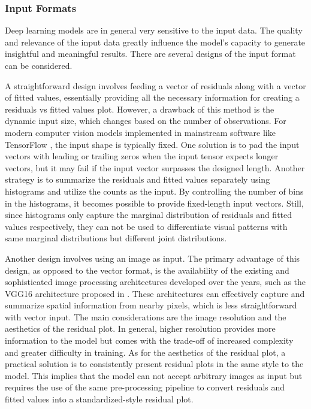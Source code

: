 \documentclass[]{interact}
\theoremstyle{plain}%
\theoremstyle{definition}
\theoremstyle{remark}
\begin{document}
\subsubsection{Input Formats}\label{input-formats}

Deep learning models are in general very sensitive to the input data.
The quality and relevance of the input data greatly influence the
model's capacity to generate insightful and meaningful results. There
are several designs of the input format can be considered.

A straightforward design involves feeding a vector of residuals along
with a vector of fitted values, essentially providing all the necessary
information for creating a residuals vs fitted values plot. However, a
drawback of this method is the dynamic input size, which changes based
on the number of observations. For modern computer vision models
implemented in mainstream software like TensorFlow
\citep{abadi2016tensorflow}, the input shape is typically fixed. One
solution is to pad the input vectors with leading or trailing zeros when
the input tensor expects longer vectors, but it may fail if the input
vector surpasses the designed length. Another strategy is to summarize
the residuals and fitted values separately using histograms and utilize
the counts as the input. By controlling the number of bins in the
histograms, it becomes possible to provide fixed-length input vectors.
Still, since histograms only capture the marginal distribution of
residuals and fitted values respectively, they can not be used to
differentiate visual patterns with same marginal distributions but
different joint distributions.

Another design involves using an image as input. The primary advantage
of this design, as opposed to the vector format, is the availability of
the existing and sophisticated image processing architectures developed
over the years, such as the VGG16 architecture proposed in
\citet{simonyan2014very}. These architectures can effectively capture
and summarize spatial information from nearby pixels, which is less
straightforward with vector input. The main considerations are the image
resolution and the aesthetics of the residual plot. In general, higher
resolution provides more information to the model but comes with the
trade-off of increased complexity and greater difficulty in training. As
for the aesthetics of the residual plot, a practical solution is to
consistently present residual plots in the same style to the model. This
implies that the model can not accept arbitrary images as input but
requires the use of the same pre-processing pipeline to convert
residuals and fitted values into a standardized-style residual plot.
\end{document}
